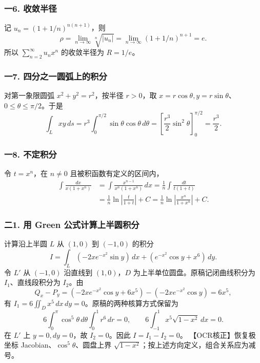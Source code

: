 \documentclass[11pt,fontset=fandol]{ctexart}
\begin{document}
\subsubsection{一6. 收敛半径}\label{ux4e006.-ux6536ux655bux534aux5f84}

记 \(u_n=(1+1/n)^{n(n+1)}\)，则 \[
\rho=\lim_{n\to\infty}\sqrt[n]{|u_n|}
=\lim_{n\to\infty}(1+1/n)^{n+1}=e.
\] 所以 \(\sum_{n=2}^\infty u_nx^n\) 的收敛半径为 \(R=1/e\)。

\subsubsection{一7.
四分之一圆弧上的积分}\label{ux4e007.-ux56dbux5206ux4e4bux4e00ux5706ux5f27ux4e0aux7684ux79efux5206}

对第一象限圆弧 \(x^2+y^2=r^2\)，按半径 \(r>0\)，取
\(x=r\cos\theta,y=r\sin\theta\)、\(0\le\theta\le\pi/2\)。于是 \[
\int_Lxy\,ds=r^3\int_0^{\pi/2}\sin\theta\cos\theta\,d\theta
=\left[\frac{r^3}{2}\sin^2\theta\right]_0^{\pi/2}=\frac{r^3}{2}.
\]

\subsubsection{一8. 不定积分}\label{ux4e008.-ux4e0dux5b9aux79efux5206}

令 \(t=x^n\)，在 \(n\ne0\) 且被积函数有定义的区间内， \[
\begin{aligned}
\int\frac{dx}{x(1+x^n)}
&=\int\frac{x^{n-1}}{x^n(1+x^n)}\,dx
=\frac1n\int\frac{dt}{t(1+t)}\\
&=\frac1n\ln\left|\frac{t}{1+t}\right|+C
=\frac1n\ln\left|\frac{x^n}{1+x^n}\right|+C.
\end{aligned}
\]

\subsubsection{二1. 用 Green
公式计算上半圆积分}\label{ux4e8c1.-ux7528-green-ux516cux5f0fux8ba1ux7b97ux4e0aux534aux5706ux79efux5206}

计算沿上半圆 \(L\) 从 \((1,0)\) 到 \((-1,0)\) 的积分 \[
I=\int_L(-2xe^{-x^2}\sin y)\,dx+(e^{-x^2}\cos y+x^6)\,dy.
\] 令 \(L'\) 从 \((-1,0)\) 沿直线到 \((1,0)\)，\(D\)
为上半单位圆盘。原稿记闭曲线积分为 \(I_1\)、直线段积分为 \(I_2\)。由 \[
Q_x-P_y=(-2xe^{-x^2}\cos y+6x^5)-(-2xe^{-x^2}\cos y)=6x^5,
\] 有 \(I_1=6\iint_Dx^5\,dx\,dy=0\)。原稿的两种核算方式保留为 \[
6\int_0^\pi\cos^5\theta\,d\theta\int_0^1r^6\,dr=0,\qquad
6\int_{-1}^1x^5\sqrt{1-x^2}\,dx=0.
\] 在 \(L'\) 上 \(y=0,dy=0\)，故 \(I_2=0\)。因此 \(I=I_1-I_2=0\)。
【OCR核正】恢复极坐标 Jacobian、\(\cos^5\theta\)、圆盘上界
\(\sqrt{1-x^2}\)；按上述方向定义，组合关系应为减号。
\end{document}
